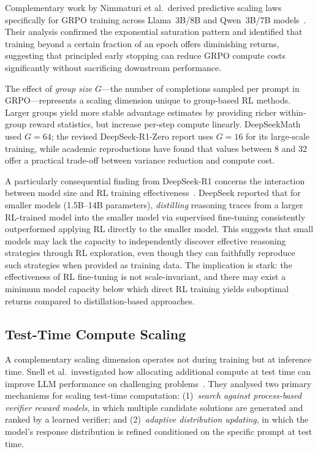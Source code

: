 Complementary work by Nimmaturi et al.\ derived predictive scaling laws
specifically for GRPO training across Llama~3B/8B and Qwen~3B/7B
models~\cite{nimmaturi2025grposcaling}.  Their analysis confirmed the
exponential saturation pattern and identified that training beyond a certain
fraction of an epoch offers diminishing returns, suggesting that principled
early stopping can reduce GRPO compute costs significantly without sacrificing
downstream performance.

The effect of \emph{group size} $G$---the number of completions sampled per
prompt in GRPO---represents a scaling dimension unique to group-based RL
methods.  Larger groups yield more stable advantage estimates by providing
richer within-group reward statistics, but increase per-step compute linearly.
DeepSeekMath used $G = 64$; the revised DeepSeek-R1-Zero report uses $G = 16$ for its large-scale training, while academic
reproductions have found that values between 8 and 32 offer a practical
trade-off between variance reduction and compute cost.

A particularly consequential finding from DeepSeek-R1 concerns the interaction
between model size and RL training
effectiveness~\cite{deepseek2025r1}.  DeepSeek reported that for smaller models
(1.5B--14B parameters), \emph{distilling} reasoning traces from a larger
RL-trained model into the smaller model via supervised fine-tuning consistently
outperformed applying RL directly to the smaller model.  This suggests that
small models may lack the capacity to independently discover effective reasoning
strategies through RL exploration, even though they can faithfully reproduce
such strategies when provided as training data.  The implication is stark: the
effectiveness of RL fine-tuning is not scale-invariant, and there may exist a
minimum model capacity below which direct RL training yields suboptimal
returns compared to distillation-based approaches.

\subsection{Test-Time Compute Scaling}

A complementary scaling dimension operates not during training but at inference
time.  Snell et al.\ investigated how allocating additional compute at test time
can improve LLM performance on challenging
problems~\cite{snell2024scaling}.  They analysed two primary mechanisms for
scaling test-time computation: (1)~\emph{search against process-based verifier
reward models}, in which multiple candidate solutions are generated and ranked
by a learned verifier; and (2)~\emph{adaptive distribution updating}, in which
the model's response distribution is refined conditioned on the specific prompt
at test time.

